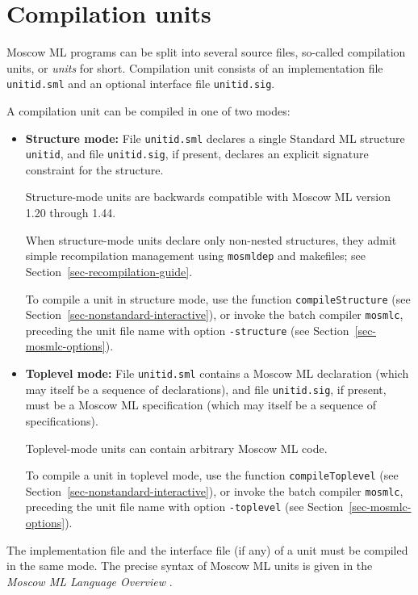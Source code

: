 \documentclass[fleqn]{article}
\begin{document}
\newpage
\section{Compilation units}
\label{sec-compilation-units}

Moscow ML programs can be split into several source files, so-called
compilation units, or \emph{units} for short.  Compilation unit
consists of an implementation file \texttt{unitid.sml} and an optional
interface file \texttt{unitid.sig}.

A compilation unit can be compiled in one of two modes: 

\begin{itemize}
\item \textbf{Structure mode:} File \texttt{unitid.sml} declares a
  single Standard ML structure \texttt{unitid}, and file
  \texttt{unitid.sig}, if present, declares an explicit signature
  constraint for the structure.
  
  Structure-mode units are backwards compatible with Moscow ML version
  1.20 through 1.44.
  
  When structure-mode units declare only non-nested structures, they
  admit simple recompilation management using \texttt{mosmldep} and
  makefiles; see Section~\ref{sec-recompilation-guide}.
  
  To compile a unit in structure mode, use the function
  \texttt{compileStructure} (see
  Section~\ref{sec-nonstandard-interactive}), or invoke the batch
  compiler \texttt{mosmlc}, preceding the unit file name with option
  \texttt{-structure} (see Section~\ref{sec-mosmlc-options}).

  
\item \textbf{Toplevel mode:} File \texttt{unitid.sml} contains a
  Moscow ML declaration (which may itself be a sequence of
  declarations), and file \texttt{unitid.sig}, if present, must be a
  Moscow ML specification (which may itself be a sequence of
  specifications).

  Toplevel-mode units can contain arbitrary Moscow ML code.
  
  To compile a unit in toplevel mode, use the function
  \texttt{compileToplevel} (see
  Section~\ref{sec-nonstandard-interactive}), or invoke the batch
  compiler \texttt{mosmlc}, preceding the unit file name with option
  \texttt{-toplevel} (see Section~\ref{sec-mosmlc-options}).

\end{itemize}

\noindent 
The implementation file and the interface file (if any) of a unit must
be compiled in the same mode.  The precise syntax of Moscow ML units
is given in the \emph{Moscow ML Language Overview}
\cite{MoscowML:2000:MoscowMLLanguage}.
\end{document}

